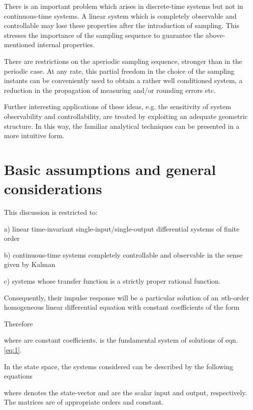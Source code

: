 \documentclass{article}
\begin{document}
There is an important problem which arises in discrete-time
systems but not in continuous-time systems. A linear system which
is completely observable and controllable may lose these
properties after the introduction of sampling. This stresses the
importance of the sampling sequence to guarantee the
above-mentioned internal properties.

There are restrictions on the aperiodic sampling sequence,
stronger than in the periodic case. At any rate, this partial
freedom in the choice of the sampling instants can be conveniently
used to obtain a rather well conditioned system, a reduction in
the propagation of measuring and/or rounding errors etc.

Further interesting applications of these ideas, e.g. the
sensitivity of system observability and controllability, are
treated by exploiting an adequate geometric structure. In this
way, the familiar analytical techniques \cite{Troch} can be
presented in a more intuitive form.

\section{Basic assumptions and general considerations}
This discussion is restricted to:
\begin{description}
\item a) linear time-invariant single-input/single-output
    differential systems of finite order 
\item b) continuous-time systems completely controllable and
    observable in the sense given by Kalman \cite{Kalman}
\item c) systems whose transfer function is a strictly proper
    rational function. \end{description}

Consequently, their impulse response  will be a particular
solution of an \textit{n}th-order homogeneous linear differential
equation with constant coefficients of the form



Therefore


where  are constant coefficients.  is the
fundamental system of solutions of eqn. \ref{eq:1}.

In the state space, the systems considered can be described by the
following equations




where  denotes the state-vector and  are the scalar input and output, respectively. The
matrices  are of appropriate orders and constant.
\end{document}

